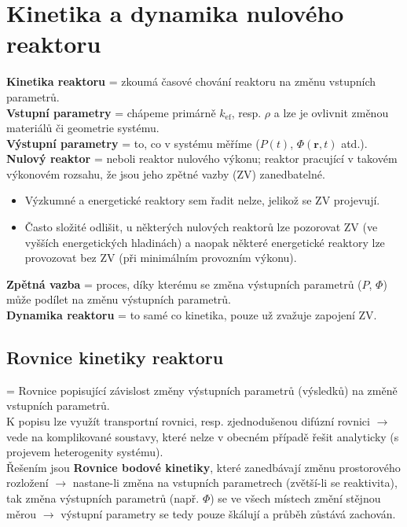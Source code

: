 \section{Kinetika a dynamika nulového reaktoru}

\textbf{Kinetika reaktoru} = zkoumá časové chování reaktoru na změnu vstupních parametrů.\\

\textbf{Vstupní parametry} = chápeme primárně $k_{\text{ef}}$, resp. $\rho$ a lze je ovlivnit změnou materiálů či geometrie systému.\\

\textbf{Výstupní parametry} = to, co v systému měříme ($P(t)$, $\Phi (\textbf{r}, t) $ atd.).\\

\textbf{Nulový reaktor} = neboli reaktor nulového výkonu; reaktor pracující v takovém výkonovém rozsahu, že jsou jeho zpětné vazby (ZV) zanedbatelné.

\begin{itemize}
  \item Výzkumné a energetické reaktory sem řadit nelze, jelikož se ZV projevují.
  \item Často složité odlišit, u některých nulových reaktorů lze pozorovat ZV (ve vyšších energetických hladinách) a naopak některé energetické reaktory lze provozovat bez ZV (při minimálním provozním výkonu).
\end{itemize}

\textbf{Zpětná vazba} = proces, díky kterému se změna výstupních parametrů ($P$, $\Phi$) může podílet na změnu výstupních parametrů.\\

\textbf{Dynamika reaktoru} = to samé co kinetika, pouze už zvažuje zapojení ZV.

\subsection{Rovnice kinetiky reaktoru}

= Rovnice popisující závislost změny výstupních parametrů (výsledků) na změně vstupních parametrů.\\

K popisu lze využít transportní rovnici, resp. zjednodušenou difúzní rovnici $\rightarrow$ vede na komplikované soustavy, které nelze v obecném případě řešit analyticky (s projevem heterogenity systému).\\

Řešením jsou \textbf{Rovnice bodové kinetiky}, které zanedbávají změnu prostorového rozložení $\rightarrow$ nastane-li změna na vstupních parametrech (zvětší-li se reaktivita), tak změna výstupních parametrů (např. $\Phi$) se ve všech místech změní stějnou měrou $\rightarrow$ výstupní parametry se tedy pouze škálují a průběh zůstává zachován.\\

